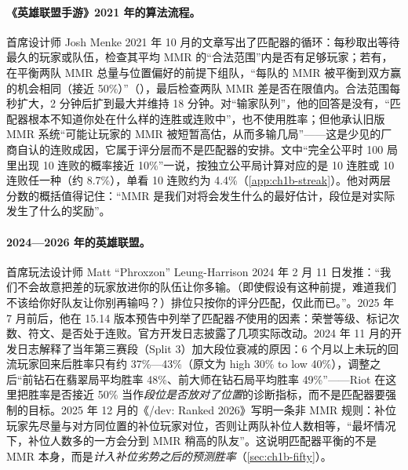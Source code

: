 \paragraph{《英雄联盟手游》2021 年的算法流程。}
首席设计师 Josh Menke 2021 年 10 月的文章写出了匹配器的循环\cite{riot2021wildrift}：每秒取出等待最久的玩家或队伍，检查其平均 MMR 的“合法范围”内是否有足够玩家；若有，在平衡两队 MMR 总量与位置偏好的前提下组队，“每队的 MMR 被平衡到双方赢的机会相同（接近 50\%）”（），最后检查两队 MMR 差是否在限值内\tagOff。合法范围每秒扩大，2 分钟后扩到最大并维持 18 分钟\tagOff。对“输家队列”，他的回答是没有，“匹配器根本不知道你处在什么样的连胜或连败中”，也不使用胜率；但他承认旧版 MMR 系统“可能让玩家的 MMR 被短暂高估，从而多输几局”\tagOff——这是少见的厂商自认的连败成因，它属于评分层而不是匹配器的安排。文中“完全公平时 100 局里出现 10 连败的概率接近 10\%”一说，按独立公平局计算对应的是 10 连胜或 10 连败任一种（约 8.7\%），单看 10 连败约为 4.4\%（\cref{app:ch1b-streak}）\tagOwn。他对两层分数的概括值得记住：“MMR 是我们对将会发生什么的最好估计，段位是对实际发生了什么的奖励”\tagOff。

\paragraph{2024—2026 年的英雄联盟。}
首席玩法设计师 Matt “Phroxzon” Leung-Harrison 2024 年 2 月 11 日发推：“我们不会故意把差的玩家放进你的队伍让你多输。（即使假设有这种前提，难道我们不该给你好队友让你别再输吗？）排位只按你的评分匹配，仅此而已。”\cite{ahn2024losers}\tagOff。2025 年 7 月前后，他在 15.14 版本预告中列举了匹配器\emph{不}使用的因素：荣誉等级、标记次数、符文、是否处于连败\cite{ggscore2025riot}\tagOff{}。官方开发日志披露了几项实际改动。2024 年 11 月的开发日志解释了当年第三赛段（Split 3）加大段位衰减的原因：6 个月以上未玩的回流玩家回来后胜率只有约 37\%—43\%（原文为 high 30\% to low 40\%），调整之后“前钻石在翡翠局平均胜率 48\%、前大师在钻石局平均胜率 49\%”\cite{riot2024ranked}\tagOff——Riot 在这里把胜率是否接近 50\% 当作\emph{段位是否放对了位置}的诊断指标，而不是匹配器要强制的目标。2025 年 12 月的《/dev: Ranked 2026》写明一条非 MMR 规则：补位玩家先尽量与对方同位置的补位玩家对位，否则让两队补位人数相等，“最坏情况下，补位人数多的一方会分到 MMR 稍高的队友”\cite{riot2025ranked}\tagOff。这说明匹配器平衡的不是 MMR 本身，而是\emph{计入补位劣势之后的预测胜率}（\cref{sec:ch1b-fifty}）。

